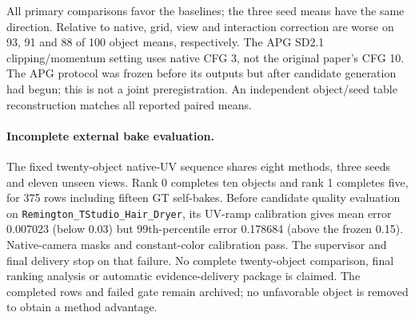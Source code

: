 All primary comparisons favor the baselines; the three seed means have the same direction. Relative to native, grid, view and interaction correction are worse on 93, 91 and 88 of 100 object means, respectively. The APG SD2.1 clipping/momentum setting uses native CFG 3, not the original paper's CFG 10. The APG protocol was frozen before its outputs but after candidate generation had begun; this is not a joint preregistration. An independent object/seed table reconstruction matches all reported paired means.

\paragraph{Incomplete external bake evaluation.}
The fixed twenty-object native-UV sequence shares eight methods, three seeds and eleven unseen views. Rank 0 completes ten objects and rank 1 completes five, for 375 rows including fifteen GT self-bakes. Before candidate quality evaluation on \texttt{Remington\_\allowbreak TStudio\_\allowbreak Hair\_\allowbreak Dryer}, its UV-ramp calibration gives mean error 0.007023 (below 0.03) but 99th-percentile error 0.178684 (above the frozen 0.15). Native-camera masks and constant-color calibration pass. The supervisor and final delivery stop on that failure. No complete twenty-object comparison, final ranking analysis or automatic evidence-delivery package is claimed. The completed rows and failed gate remain archived; no unfavorable object is removed to obtain a method advantage.
